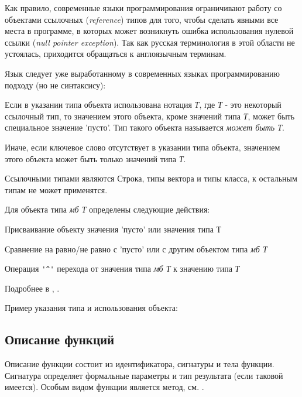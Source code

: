 Как правило, современные языки программирования ограничивают работу со объектами ссылочных (\emph{reference}) типов для того, 
чтобы сделать явными все места в программе, в которых может возникнуть ошибка использования нулевой ссылки (\emph{null pointer exception}). 
Так как русская терминология в этой области не устоялась, приходится обращаться к англоязычным терминам.

Язык \thelang{} следует уже выработанному в современных языках программированию подходу (но не синтаксису):
\begin{d_itemize}
\item
    Если в указании типа объекта использована нотация \emph{ Т}, где \emph{Т} - это некоторый ссылочный тип,  
    то значением этого объекта, кроме значений типа \emph{Т}, может быть специальное значение 'пусто'. Тип такого объекта называется \emph{может быть Т}.
\item
    Иначе, если ключевое слово  отсутствует в указании типа объекта, значением этого объекта может быть только значений типа \emph{Т}.
\end{d_itemize}

Ссылочными типами являются Строка, типы вектора и типы класса, к остальным типам  не может применятся.

Для объекта типа \emph{мб Т} определены следующие действия:
\begin{d_itemize}
\item
    Присваивание объекту значения 'пусто' или значения типа Т
\item
    Сравнение на равно/не равно с 'пусто'  или с другим объектом типа \emph{мб Т}
\item
    Операция \verb+'^'+ перехода от значения типа \emph{мб Т} к значению типа \emph{Т}
\end{d_itemize}
Подробнее в  , .

\bigskip
Пример указания типа и использования объекта:


\hypertarget{functions}{%
\subsection{Описание функций}\label{decls:functions}}

Описание функции состоит из идентификатора, сигнатуры  и тела функции. 
Сигнатура определяет формальные параметры и тип результата (если таковой имеется). 
Особым видом функции является метод, см. .

